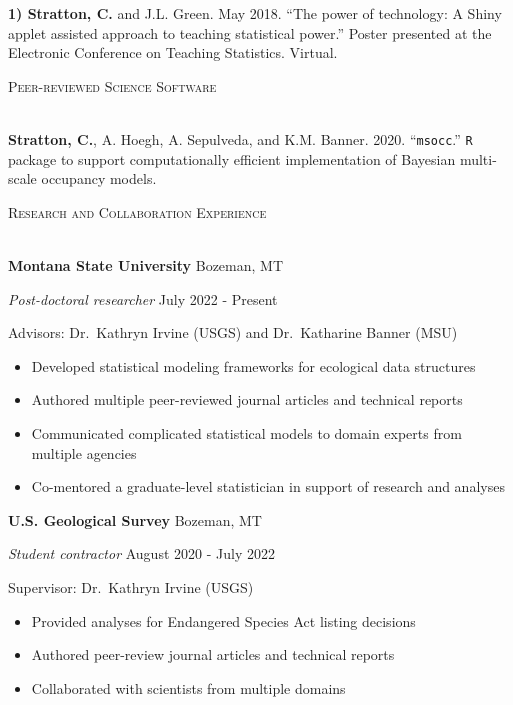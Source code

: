 \documentclass[a4paper]{article}
\newcommand{\lineunder} {
	\vspace*{-8pt} \\
	\hspace*{-18pt} \hrulefill \\
}
\newcommand{\header} [1] {
	{\hspace*{-18pt}\vspace*{6pt} \textcolor{Cerulean}{\textsc{#1}}}
	\vspace*{-6pt} \textcolor{Cerulean}{\lineunder}
}
\begin{document}
\textbf{1) Stratton, C.} and J.L. Green. May 2018. ``The power of
technology: A Shiny applet assisted approach to teaching statistical
power.'' Poster presented at the Electronic Conference on Teaching
Statistics. Virtual. \vspace*{2mm}

\header{Peer-reviewed Science Software}
\vspace*{2mm}

\textbf{Stratton, C.}, A. Hoegh, A. Sepulveda, and K.M. Banner. 2020.
``\texttt{msocc}.'' \texttt{R} package to support computationally
efficient implementation of Bayesian multi-scale occupancy models.
\vspace*{2mm}

\header{Research and Collaboration Experience}
\vspace*{2mm}

\textbf{Montana State University} \hfill Bozeman, MT

\textit{Post-doctoral researcher} \hfill July 2022 - Present

Advisors: Dr.~Kathryn Irvine (USGS) and Dr.~Katharine Banner (MSU)

\vspace{-1mm}
\begin{itemize} \itemsep 1pt
    \item Developed statistical modeling frameworks for ecological data structures
    \item Authored multiple peer-reviewed journal articles and technical reports
    \item Communicated complicated statistical models to domain experts from multiple agencies
    \item Co-mentored a graduate-level statistician in support of research and analyses
\end{itemize}

\textbf{U.S. Geological Survey} \hfill Bozeman, MT

\textit{Student contractor} \hfill August 2020 - July 2022

Supervisor: Dr.~Kathryn Irvine (USGS)

\vspace{-1mm}
\begin{itemize} \itemsep 1pt
   \item Provided analyses for Endangered Species Act listing decisions
   \item Authored peer-review journal articles and technical reports
   \item Collaborated with scientists from multiple domains 
\end{itemize}
\end{document}
